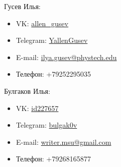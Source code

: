 \documentclass[10pt]{beamer}
\title[Контакты]{}
\date{Москва, 2018}
\begin{document}
\begin{frame}

\begin{multicols}{2}
Гусев Илья:
  \begin{itemize}
      \item VK: \href{https://vk.com/allen_gusev}{allen\_gusev}
      \item Telegram: \href{https://t.me/YallenGusev}{YallenGusev}
      \item E-mail: \href{mailto:phoenixilya@gmail.com}{ilya.gusev@phystech.edu}
      \item Телефон: +79252295035
  \end{itemize}

Булгаков Илья:
  \begin{itemize}
      \item VK: \href{https://vk.com/id227657}{id227657}
      \item Telegram: \href{https://t.me/bulgak0v}{bulgak0v}
      \item E-mail: \href{mailto:writer.msu@gmail.com}{writer.msu@gmail.com}
      \item Телефон: +79268165877
  \end{itemize}

\end{multicols}

\end{frame}
\end{document}
